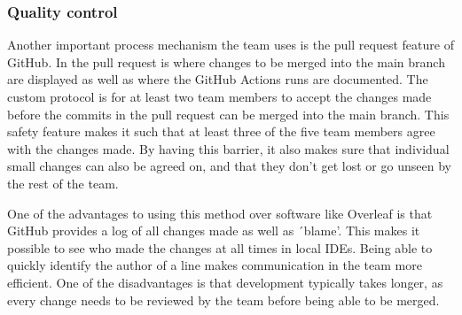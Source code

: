 
\subsubsection{Quality control}

Another important process mechanism the team uses is the pull request feature of GitHub.
In the pull request is where changes to be merged into the main branch are displayed as well as where the GitHub Actions
runs are documented.
The custom protocol is for at least two team members to accept the changes made before the commits in the pull request
can be merged into the main branch.
This safety feature makes it such that at least three of the five team members agree with the changes made.
By having this barrier, it also makes sure that individual small changes can also be agreed on, and that they don't get
lost or go unseen by the rest of the team.

One of the advantages to using this method over software like Overleaf is that GitHub provides a log of all changes made
as well as ´blame'.
This makes it possible to see who made the changes at all times in local IDEs.
Being able to quickly identify the author of a line makes communication in the team more efficient.
One of the disadvantages is that development typically takes longer, as every change needs to be reviewed by the team
before being able to be merged.
